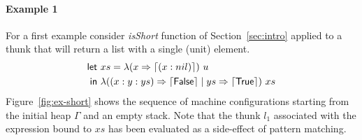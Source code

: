 \paragraph{Example 1}
For a first example consider \textit{isShort} function of
Section~\ref{sec:intro} applied to a thunk that will return a list
with a single (unit) element.
\begin{equation}
  \begin{split}
  \textsf{let}~&xs = \lambda(x \Rightarrow \left\lceil (x : nil)\right\rceil)~u \\
  \textsf{in}~&\lambda((x : y : ys) \Rightarrow \left\lceil \textsf{False}\right\rceil \mid ys \Rightarrow \left\lceil \textsf{True}\right\rceil)~xs
  \end{split} \label{eq:example1}
\end{equation}
Figure~\ref{fig:ex-short} shows the sequence of machine configurations
starting from the initial heap $\Gamma$ and an empty stack.  Note that
the thunk $l_1$ associated with the expression bound to $xs$ 
has been evaluated as a side-effect of pattern matching.

